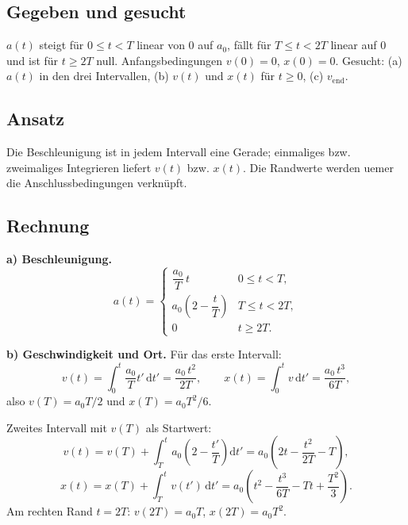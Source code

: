 
\subsection*{Gegeben und gesucht}
$a(t)$ steigt für $0\le t<T$ linear von $0$ auf $a_0$, fällt für
$T\le t<2T$ linear auf $0$ und ist für $t\ge2T$ null.
Anfangsbedingungen $v(0)=0$, $x(0)=0$. Gesucht: (a) $a(t)$ in den drei
Intervallen, (b) $v(t)$ und $x(t)$ für $t\ge0$, (c) $v_{\mathrm{end}}$.

\subsection*{Ansatz}
Die Beschleunigung ist in jedem Intervall eine Gerade; einmaliges bzw.
zweimaliges Integrieren liefert $v(t)$ bzw. $x(t)$. Die Randwerte werden
uemer die Anschlussbedingungen verknüpft.

\subsection*{Rechnung}
\textbf{a) Beschleunigung.}
\begin{equation}
  a(t)=\begin{cases}
    \dfrac{a_0}{T}\,t & 0\le t<T,\\[1.5ex]
    a_0\left(2-\dfrac{t}{T}\right) & T\le t<2T,\\[1.5ex]
    0 & t\ge2T.
  \end{cases}
\end{equation}

\textbf{b) Geschwindigkeit und Ort.} Für das erste Intervall:
\begin{equation}
  v(t)=\int_0^t \frac{a_0}{T}t'\,\mathrm dt'=\frac{a_0\,t^2}{2T},
  \qquad x(t)=\int_0^t v\,\mathrm dt'=\frac{a_0\,t^3}{6T},
\end{equation}
also $v(T)=a_0T/2$ und $x(T)=a_0T^2/6$.

Zweites Intervall mit $v(T)$ als Startwert:
\begin{equation}
  v(t)=v(T)+\int_T^t a_0\left(2-\frac{t'}{T}\right)\mathrm dt'
  = a_0\left(2t-\frac{t^2}{2T}-T\right),
\end{equation}
\begin{equation}
  x(t)=x(T)+\int_T^t v(t')\,\mathrm dt'
  = a_0\left(t^2-\frac{t^3}{6T}-Tt+\frac{T^2}{3}\right).
\end{equation}
Am rechten Rand $t=2T$: $v(2T)=a_0T$, $x(2T)=a_0T^2$.

